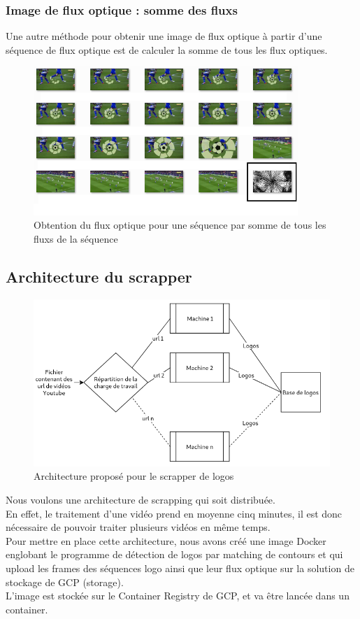 \documentclass[11pt]{article}
\begin{document}
\subsubsection{Image de flux optique : somme des fluxs}
\label{sec:orga5216fa}
Une autre méthode pour obtenir une image de flux optique à partir d'une séquence de flux optique est de calculer la somme de tous les flux optiques.\\
\begin{figure}[htbp]
\centering
\includegraphics[width=10cm]{optical_flow_sum.png}
\caption{Obtention du flux optique pour une séquence par somme de tous les fluxs de la séquence}
\end{figure}



\subsection{Architecture du scrapper}
\label{sec:org3a74458}
\begin{figure}[htbp]
\centering
\includegraphics[width=15cm]{arch_scrap.png}
\caption{Architecture proposé pour le scrapper de logos}
\end{figure}
Nous voulons une architecture de scrapping qui soit distribuée.\\
En effet, le traitement d'une vidéo prend en moyenne cinq minutes, il est donc nécessaire de pouvoir traiter plusieurs vidéos en même temps.\\
Pour mettre en place cette architecture, nous avons créé une image Docker englobant le programme de détection de logos par matching de contours et qui upload les frames des séquences logo ainsi que leur flux optique sur la solution de stockage de GCP (storage).\\
L'image est stockée sur le Container Registry de GCP, et va être lancée dans un container.\\
\end{document}
